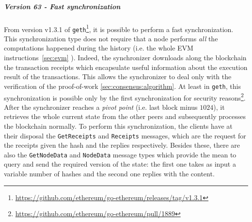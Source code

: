 \subparagraph{Version 63 - Fast synchronization}
\label{sec:fast-sync}
From version v1.3.1 of
\texttt{geth}\footnote{\url{https://github.com/ethereum/go-ethereum/releases/tag/v1.3.1}},
it is possible to perform a fast synchronization. This synchronization type does
not require that a node performs \emph{all} the computations happened during the
history (i.e. the whole EVM instructions~\autoref{sec:evm} ). Indeed, the
synchronizer downloads along the blockchain the transaction receipts which
encapsulate useful information about the execution result of the transactions.
This allows the synchronizer to deal only with the verification of the
proof-of-work \autoref{sec:consensus:algorithm}. At least in \texttt{geth}, this
synchronization is possible only by the first synchronization for security
reasons\footnote{\url{https://github.com/ethereum/go-ethereum/pull/1889}}. After
the synchronizer reaches a \emph{pivot point} (i.e. last block minus $1024$), it
retrieves the whole current state from the other peers and subsequently
processes the blockchain normally. To perform this synchronization, the clients
have at their disposal the \texttt{GetReceipts} and \texttt{Receipts} messages,
which are the request for the receipts given the hash and the replies
respectively. Besides these, there are also the \texttt{GetNodeData} and
\texttt{NodeData} message types which provide the mean to query and send the
required version of the state: the first one takes as input a variable number of
hashes and the second one replies with the content.
